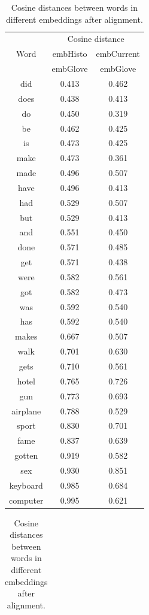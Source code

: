 \documentclass[runningheads]{llncs}
\begin{document}
\begin{table}
\begin{minipage}{.44\linewidth}
\label{tab:cosdist}
\centering
\caption{Cosine distances between words in different embeddings after alignment.}
\begin{tabular}{|c|c|c|}
\hline
\multirow{3}{*}{Word} & \multicolumn{2}{|c|}{Cosine distance}\\\cline{2-3}
&embHisto&embCurrent\\\cline{2-3}
&embGlove&embGlove\\
\hline
did & 0.413 & 0.462\\
does & 0.438 & 0.413\\
do & 0.450 & 0.319\\
be & 0.462 & 0.425\\
is & 0.473 & 0.425\\
make & 0.473 & 0.361\\
made & 0.496 & 0.507\\
have & 0.496 & 0.413\\
had & 0.529 & 0.507\\
but & 0.529 & 0.413\\
and & 0.551 & 0.450\\
done & 0.571 & 0.485\\
get & 0.571 & 0.438\\
were & 0.582 & 0.561\\
got & 0.582 & 0.473\\
was & 0.592 & 0.540\\
has & 0.592 & 0.540\\
makes & 0.667 & 0.507\\
walk & 0.701 & 0.630\\
gets & 0.710 & 0.561\\
hotel & 0.765 & 0.726\\
gun & 0.773 & 0.693\\
airplane & 0.788 & 0.529\\
sport & 0.830 & 0.701\\
fame & 0.837 & 0.639\\
gotten & 0.919 & 0.582\\
sex & 0.930 & 0.851\\
keyboard & 0.985 & 0.684\\
computer & 0.995 & 0.621\\
\hline
\end{tabular}
\end{minipage}
\begin{minipage}{.1\linewidth}
\begin{tabular}{c}

\end{tabular}
\end{minipage}
\end{table}
\end{document}
